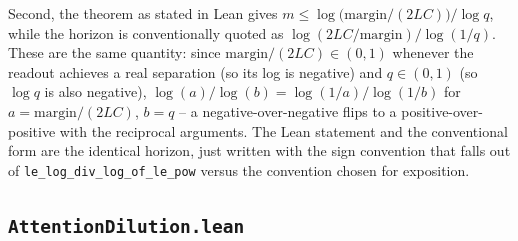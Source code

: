 \documentclass[11pt]{article}
\begin{document}
Second, the theorem as stated in Lean gives
$m \le \log\!\big(\text{margin}/(2LC)\big)/\log q$, while the horizon is
conventionally quoted as $\log(2LC/\text{margin})/\log(1/q)$. These
are the same quantity: since $\text{margin}/(2LC) \in (0,1)$ whenever the
readout achieves a real separation (so its log is negative) and $q\in(0,1)$
(so $\log q$ is also negative), $\log(a)/\log(b) = \log(1/a)/\log(1/b)$ for
$a=\text{margin}/(2LC)$, $b=q$ -- a negative-over-negative flips to a
positive-over-positive with the reciprocal arguments. The Lean statement and
the conventional form are the identical horizon, just written with the
sign convention that falls out of \texttt{le\_log\_div\_log\_of\_le\_pow}
versus the convention chosen for exposition.

\subsection{\texttt{AttentionDilution.lean}}
\label{sec:s1-dilution}
\end{document}
